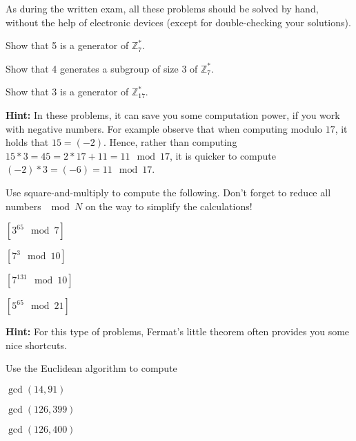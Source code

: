 \documentclass[a4paper,10pt,landscape,twocolumn]{scrartcl}
\begin{document}
\practiceproblems

As during the written exam, all these problems should be solved by hand, without the help of electronic devices (except for double-checking your solutions).

\begin{exercise} 

\begin{subex} 
  Show that 5 is a generator of $\mathbb{Z}_7^*$.
\end{subex}
\begin{subex}
  Show that 4 generates a subgroup of size 3 of $\mathbb{Z}_7^*$.
\end{subex}
\begin{subex}
  Show that 3 is a generator of $\mathbb{Z}_{17}^*$.
\end{subex}

\textbf{Hint: } In these problems, it can save you some computation power, if you work with negative numbers. For example observe that when computing modulo $17$, it holds that $15 = (-2)$. Hence, rather than computing $15*3=45=2*17+11=11 \mod 17$, it is quicker to compute $(-2)*3=(-6)=11 \mod 17$.
\end{exercise}

\begin{exercise}  Use square-and-multiply to compute the following. Don't forget to reduce all numbers $\mod N$ on the way to simplify the calculations!
\begin{subex}
$[3^{65} \mod 7]$
\end{subex}
\begin{subex}
$[7^3 \mod 10]$
\end{subex}
\begin{subex}
$[7^{131} \mod 10]$
\end{subex}
\begin{subex}
$[5^{65} \mod 21]$
\end{subex}
\textbf{Hint: } For this type of problems, Fermat's little theorem often provides you some nice shortcuts.
\end{exercise}

\begin{exercise}  Use the Euclidean algorithm
  to compute
\begin{subex}
  $\gcd(14,91)$
\end{subex}
\begin{subex}
  $\gcd(126, 399)$
\end{subex}
\begin{subex}
  $\gcd(126,400)$
\end{subex}
\end{exercise}
\end{document}
